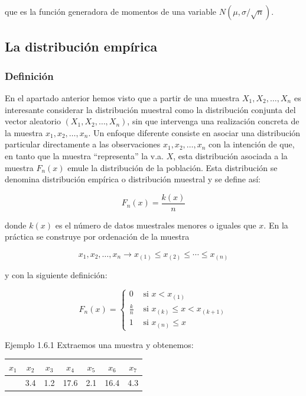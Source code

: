 \documentclass[
]{article}
\begin{document}
que es la función generadora de momentos de una variable \(N(\mu, \sigma / \sqrt{n})\).

\subsection{La distribución empírica}\label{la-distribuciuxf3n-empuxedrica}

\subsubsection{Definición}\label{definiciuxf3n-2}

En el apartado anterior hemos visto que a partir de una muestra \(X_{1}, X_{2}, \ldots, X_{n}\) es interesante considerar la distribución muestral como la distribución conjunta del vector aleatorio \(\left(X_{1}, X_{2}, \ldots, X_{n}\right)\), sin que intervenga una realización concreta de la muestra \(x_{1}, x_{2}, \ldots, x_{n}\). Un enfoque diferente consiste en asociar una distribución particular directamente a las observaciones \(x_{1}, x_{2}, \ldots, x_{n}\) con la intención de que, en tanto que la muestra ``representa'' la v.a. \(X\), esta distribución asociada a la muestra \(F_{n}(x)\) emule la distribución de la población. Esta distribución se denomina distribución empírica o distribución muestral y se define así:

\[
F_{n}(x)=\frac{k(x)}{n}
\]

donde \(k(x)\) es el número de datos muestrales menores o iguales que \(x\). En la práctica se construye por ordenación de la muestra

\[
x_{1}, x_{2}, \ldots, x_{n} \longrightarrow x_{(1)} \leq x_{(2)} \leq \cdots \leq x_{(n)}
\]

y con la siguiente definición:

\[
F_{n}(x)= \begin{cases}0 & \text { si } x<x_{(1)} \\ \frac{k}{n} & \text { si } x_{(k)} \leq x<x_{(k+1)} \\ 1 & \text { si } x_{(n)} \leq x\end{cases}
\]

Ejemplo 1.6.1 Extraemos una muestra y obtenemos:

\begin{longtable}[]{@{}ccccccc@{}}
\toprule\noalign{}
\(x_{1}\) & \(x_{2}\) & \(x_{3}\) & \(x_{4}\) & \(x_{5}\) & \(x_{6}\) & \(x_{7}\) \\
\midrule\noalign{}
\endhead
\bottomrule\noalign{}
\endlastfoot
5.1 & 3.4 & 1.2 & 17.6 & 2.1 & 16.4 & 4.3 \\
\end{longtable}
\end{document}
